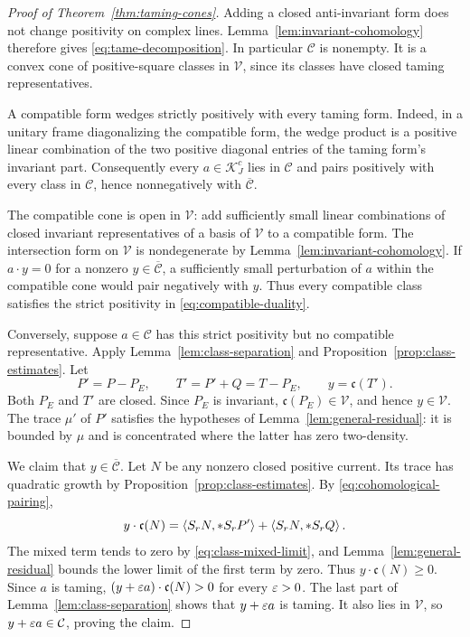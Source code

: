 \begin{proof}[Proof of Theorem~\ref{thm:taming-cones}]
Adding a closed anti-invariant form does not change positivity on
complex lines. Lemma~\ref{lem:invariant-cohomology} therefore gives
\eqref{eq:tame-decomposition}. In particular \(\mathcal C\) is
nonempty. It is a convex cone of positive-square classes in
\(\mathcal V\), since its classes have closed taming representatives.

A compatible form wedges strictly positively with every taming form.
Indeed, in a unitary frame diagonalizing the compatible form, the
wedge product is a positive linear combination of the two positive
diagonal entries of the taming form's invariant part. Consequently
every \(a\in\mathcal K_J^c\) lies in \(\mathcal C\) and pairs
positively with every class in \(\mathcal C\), hence nonnegatively
with \(\overline{\mathcal C}\).

The compatible cone is open in \(\mathcal V\): add sufficiently
small linear combinations of closed invariant representatives of a
basis of \(\mathcal V\) to a compatible form. The intersection form
on \(\mathcal V\) is nondegenerate by
Lemma~\ref{lem:invariant-cohomology}. If \(a\cdot y=0\) for a
nonzero \(y\in\overline{\mathcal C}\), a sufficiently small
perturbation of \(a\) within the compatible cone would pair
negatively with \(y\). Thus every compatible class satisfies the
strict positivity in \eqref{eq:compatible-duality}.

Conversely, suppose \(a\in\mathcal C\) has this strict positivity
but no compatible representative. Apply
Lemma~\ref{lem:class-separation} and
Proposition~\ref{prop:class-estimates}. Let
\[
 P'=P-P_E,\qquad T'=P'+Q=T-P_E,\qquad
 y=\mathfrak c(T').
\]
Both \(P_E\) and \(T'\) are closed. Since \(P_E\) is invariant,
\(\mathfrak c(P_E)\in\mathcal V\), and hence \(y\in\mathcal V\).
The trace \(\mu'\) of \(P'\) satisfies the hypotheses of
Lemma~\ref{lem:general-residual}: it is bounded by \(\mu\) and
is concentrated where the latter has zero two-density.

We claim that \(y\in\overline{\mathcal C}\). Let \(N\) be any
nonzero closed positive current. Its trace has quadratic growth by
Proposition~\ref{prop:class-estimates}. By
\eqref{eq:cohomological-pairing},
\[
 y\cdot\mathfrak c(N)
 =\left\langle S_rN,*S_rP'\right\rangle+\left\langle S_rN,*S_rQ\right\rangle.
\]
The mixed term tends to zero by \eqref{eq:class-mixed-limit}, and
Lemma~\ref{lem:general-residual} bounds the lower limit of the first
term by zero. Thus \(y\cdot\mathfrak c(N)\ge0\). Since \(a\)
is taming, \((y+\varepsilon a)\cdot\mathfrak c(N)>0\) for every
\(\varepsilon>0\). The last part of Lemma~\ref{lem:class-separation}
shows that \(y+\varepsilon a\) is taming. It also lies in \(\mathcal V\),
so \(y+\varepsilon a\in\mathcal C\), proving the claim.


\end{proof}
